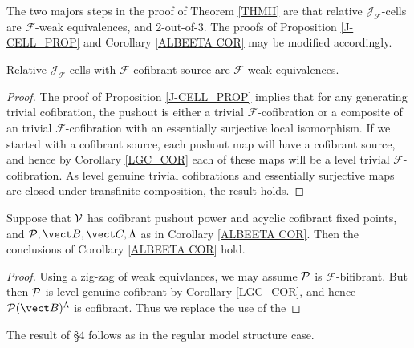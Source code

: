 \documentclass[a4paper,10pt
]{article}%
\renewcommand{\F}{\mathcal F}
\renewcommand{\1}{\eta}%
\begin{document}
The two majors steps in the proof of Theorem \ref{THMII} are that  relative $\mathcal J_\F$-cells are $\F$-weak equivalences, and 2-out-of-3.
The proofs of Proposition \ref{J-CELL_PROP} and Corollary \ref{ALBEETA COR} may be modified accordingly.

\begin{proposition}
	Relative $\mathcal J_\F$-cells with $\F$-cofibrant source are $\F$-weak equivalences.
\end{proposition}

\begin{proof}
	The proof of Proposition \ref{J-CELL_PROP} implies that for any generating trivial cofibration,
	the pushout is either a trivial $\F$-cofibration or a composite of an trivial $\F$-cofibration with an essentially surjective local isomorphism.
	If we started with a cofibrant source, each pushout map will have a cofibrant source,
	and hence by Corollary \ref{LGC_COR} each of these maps will be a level trivial $\F$-cofibration.
	As level genuine trivial cofibrations and essentially surjective maps are closed under transfinite composition, the result holds.
\end{proof}

\begin{proposition}
	Suppose that $\V$ has cofibrant pushout power and acyclic cofibrant fixed points,
	and $\P, \vect B, \vect C, \Lambda$ as in Corollary \ref{ALBEETA COR}.
	Then the conclusions of Corollary \ref{ALBEETA COR} hold.
\end{proposition}
\begin{proof}
	Using a zig-zag of weak equivlances, we may assume $\P$ is $\F$-bifibrant.
	But then $\P$ is level genuine cofibrant by Corollary \ref{LGC_COR},
	and hence $\P(\vect B)^\Lambda$ is cofibrant.
	Thus we replace the use of the 
\end{proof}

The result of \S 4 follows as in the regular model structure case.
\end{document}
